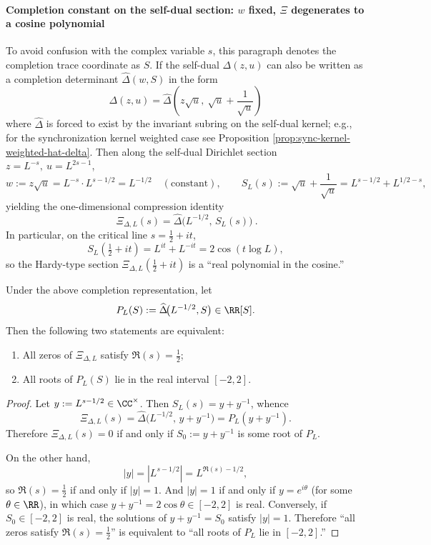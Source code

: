 \paragraph{Completion constant on the self-dual section: \texorpdfstring{$w$}{w} fixed, \texorpdfstring{$\Xi$}{Xi} degenerates to a cosine polynomial}
To avoid confusion with the complex variable \(s\), this paragraph denotes the completion trace coordinate as \(S\).
If the self-dual \(\Delta(z,u)\) can also be written as a completion determinant
\(\widehat\Delta(w,S)\) in the form
\[
\Delta(z,u)=\widehat\Delta\!\left(z\sqrt{u},\ \sqrt{u}+\frac{1}{\sqrt{u}}\right)
\]
where \(\widehat\Delta\) is forced to exist by the invariant subring on the self-dual kernel; e.g., for the synchronization kernel weighted case see Proposition \ref{prop:sync-kernel-weighted-hat-delta}.
Then along the self-dual Dirichlet section \(z=L^{-s},\ u=L^{2s-1}\),
\[
w:=z\sqrt{u}=L^{-s}\cdot L^{s-1/2}=L^{-1/2}\quad(\text{constant}),
\qquad
S_L(s):=\sqrt{u}+\frac{1}{\sqrt{u}}=L^{s-1/2}+L^{1/2-s},
\]
yielding the one-dimensional compression identity
\[
\boxed{\ \Xi_{\Delta,L}(s)=\widehat\Delta\!\bigl(L^{-1/2},\,S_L(s)\bigr)\ }.
\]
In particular, on the critical line \(s=\tfrac12+it\),
\[
S_L\!\left(\tfrac12+it\right)=L^{it}+L^{-it}=2\cos(t\log L),
\]
so the Hardy-type section \(\Xi_{\Delta,L}(\tfrac12+it)\) is a ``real polynomial in the cosine.''



\begin{proposition}\label{prop:xi-rh-interval-criterion}
Under the above completion representation, let
\[
P_L(S):=\widehat\Delta\!\bigl(L^{-1/2},S\bigr)\in\RR[S].
\]
Then the following two statements are equivalent:
\begin{enumerate}
  \item All zeros of \(\Xi_{\Delta,L}\) satisfy \(\Re(s)=\tfrac12\);
  \item All roots of \(P_L(S)\) lie in the real interval \([-2,2]\).
\end{enumerate}
\end{proposition}
\begin{proof}
Let \(y:=L^{s-1/2}\in\CC^\times\). Then \(S_L(s)=y+y^{-1}\), whence
\[
\Xi_{\Delta,L}(s)=\widehat\Delta\!\bigl(L^{-1/2},\,y+y^{-1}\bigr)=P_L(y+y^{-1}).
\]
Therefore \(\Xi_{\Delta,L}(s)=0\) if and only if \(S_0:=y+y^{-1}\) is some root of \(P_L\).
\par
On the other hand,
\[
|y|=|L^{s-1/2}|=L^{\Re(s)-1/2},
\]
so \(\Re(s)=\tfrac12\) if and only if \(|y|=1\).
And \(|y|=1\) if and only if \(y=e^{i\theta}\) (for some \(\theta\in\RR\)), in which case
\(
y+y^{-1}=2\cos\theta\in[-2,2]
\) is real.
Conversely, if \(S_0\in[-2,2]\) is real, the solutions of \(y+y^{-1}=S_0\) satisfy \(|y|=1\).
Therefore ``all zeros satisfy \(\Re(s)=\tfrac12\)'' is equivalent to ``all roots of \(P_L\) lie in \([-2,2]\).''
\end{proof}

